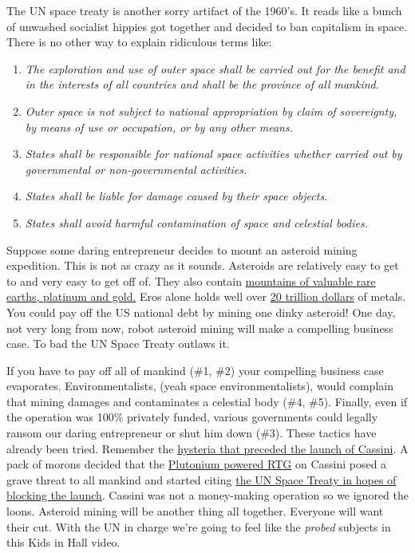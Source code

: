 The UN space treaty is another sorry artifact of the 1960's. It reads
like a bunch of unwashed socialist hippies got together and decided to
ban capitalism in space. There is no other way to explain ridiculous
terms like:

\begin{enumerate}
\item
  \emph{The exploration and use of outer space shall be carried out for
  the benefit and in the interests of all countries and shall be the
  province of all mankind}.
\item
  \emph{Outer space is not subject to national appropriation by claim of
  sovereignty, by means of use or occupation, or by any other means.}
\item
  \emph{States shall be responsible for national space activities
  whether carried out by governmental or non-governmental activities.}
\item
  \emph{States shall be liable for damage caused by their space
  objects.}
\item
  \emph{States shall avoid harmful contamination of space and celestial
  bodies.}
\end{enumerate}
Suppose some daring entrepreneur decides to mount an asteroid mining
expedition. This is not as crazy as it sounds. Asteroids are relatively
easy to get to and very easy to get off of. They also contain
\href{http://news.bbc.co.uk/2/hi/sci/tech/401227.stm}{mountains of
valuable rare earths, platinum and gold.} Eros alone holds well over
\href{http://www.suite101.com/content/economic-impact-of-asteroids-space-exploration-a187015}{20
trillion dollars} of metals. You could pay off the US national debt by
mining one dinky asteroid! One day, not very long from now, robot
asteroid mining will make a compelling business case. To bad the UN
Space Treaty outlaws it.

If you have to pay off all of mankind (\#1, \#2) your compelling
business case evaporates. Environmentalists, (yeah space
environmentalists), would complain that mining damages and contaminates
a celestial body (\#4, \#5). Finally, even if the operation was 100\%
privately funded, various governments could legally ransom our daring
entrepreneur or shut him down (\#3). These tactics have already been
tried. Remember the
\href{http://articles.latimes.com/1997/oct/01/local/me-37979}{hysteria
that preceded the launch of Cassini}. A pack of morons decided that the
\href{http://en.wikipedia.org/wiki/Radioisotope\_thermoelectric\_generator}{Plutonium
powered RTG} on Cassini posed a grave threat to all mankind and started
citing \href{http://www.animatedsoftware.com/cassini/trea9704.htm}{the
UN Space Treaty in hopes of blocking the launch}. Cassini was not a
money-making operation so we ignored the loons. Asteroid mining will be
another thing all together. Everyone will want their cut. With the UN in
charge we're going to feel like the \emph{probed} subjects in this Kids
in Hall video.


